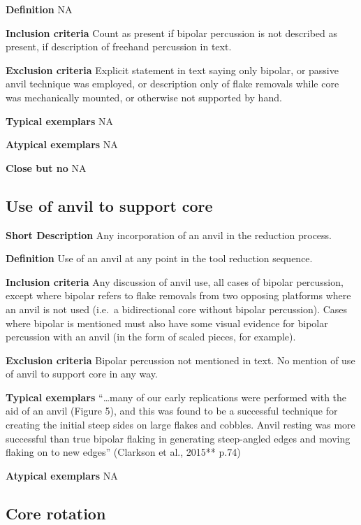 \documentclass[
]{article}
\begin{document}
\textbf{Definition} NA

\textbf{Inclusion criteria} Count as present if bipolar percussion is
not described as present, if description of freehand percussion in text.

\textbf{Exclusion criteria} Explicit statement in text saying only
bipolar, or passive anvil technique was employed, or description only of
flake removals while core was mechanically mounted, or otherwise not
supported by hand.

\textbf{Typical exemplars} NA

\textbf{Atypical exemplars} NA

\textbf{Close but no} NA

\hypertarget{use-of-anvil-to-support-core}{%
\subsection{Use of anvil to support
core}\label{use-of-anvil-to-support-core}}

\textbf{Short Description} Any incorporation of an anvil in the
reduction process.

\textbf{Definition} Use of an anvil at any point in the tool reduction
sequence.

\textbf{Inclusion criteria} Any discussion of anvil use, all cases of
bipolar percussion, except where bipolar refers to flake removals from
two opposing platforms where an anvil is not used (i.e.~a bidirectional
core without bipolar percussion). Cases where bipolar is mentioned must
also have some visual evidence for bipolar percussion with an anvil (in
the form of scaled pieces, for example).

\textbf{Exclusion criteria} Bipolar percussion not mentioned in text. No
mention of use of anvil to support core in any way.

\textbf{Typical exemplars} ``\ldots many of our early replications were
performed with the aid of an anvil (Figure 5), and this was found to be
a successful technique for creating the initial steep sides on large
flakes and cobbles. Anvil resting was more successful than true bipolar
flaking in generating steep-angled edges and moving flaking on to new
edges'' (Clarkson et al., 2015** p.74)

\textbf{Atypical exemplars} NA

\hypertarget{core-rotation}{%
\subsection{Core rotation}\label{core-rotation}}
\end{document}
